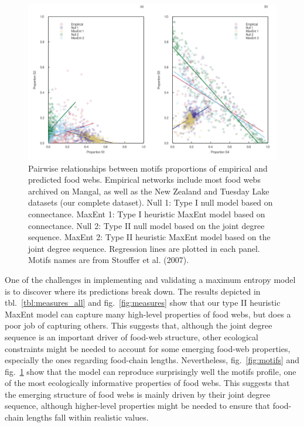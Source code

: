 \documentclass[10pt,oneside]{article}
\makeatletter
\def\maxwidth{\ifdim\Gin@nat@width>\linewidth\linewidth
\else\Gin@nat@width\fi}
\let\Oldincludegraphics\includegraphics
\renewcommand{\includegraphics}[1]{\Oldincludegraphics[width=\maxwidth]{#1}}
\makeatother
\begin{document}
\begin{figure}
\hypertarget{fig:motifs_rel}{%
\centering
\includegraphics{figures/motifs_relations.png}
\caption{Pairwise relationships between motifs proportions of empirical
and predicted food webs. Empirical networks include most food webs
archived on Mangal, as well as the New Zealand and Tuesday Lake datasets
(our complete dataset). Null 1: Type I null model based on connectance.
MaxEnt 1: Type I heuristic MaxEnt model based on connectance. Null 2:
Type II null model based on the joint degree sequence. MaxEnt 2: Type II
heuristic MaxEnt model based on the joint degree sequence. Regression
lines are plotted in each panel. Motifs names are from Stouffer et al.
(2007).}\label{fig:motifs_rel}
}
\end{figure}

One of the challenges in implementing and validating a maximum entropy
model is to discover where its predictions break down. The results
depicted in tbl.~\ref{tbl:measures_all} and fig.~\ref{fig:measures} show
that our type II heuristic MaxEnt model can capture many high-level
properties of food webs, but does a poor job of capturing others. This
suggests that, although the joint degree sequence is an important driver
of food-web structure, other ecological constraints might be needed to
account for some emerging food-web properties, especially the ones
regarding food-chain lengths. Nevertheless, fig.~\ref{fig:motifs} and
fig.~\ref{fig:motifs_rel} show that the model can reproduce surprisingly
well the motifs profile, one of the most ecologically informative
properties of food webs. This suggests that the emerging structure of
food webs is mainly driven by their joint degree sequence, although
higher-level properties might be needed to ensure that food-chain
lengths fall within realistic values.
\end{document}
